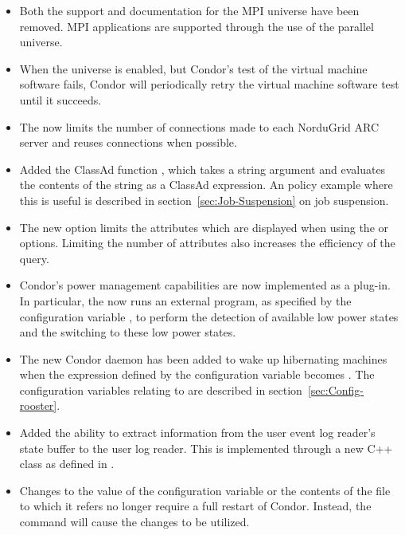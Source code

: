 \begin{itemize}
\item Both the support and documentation for the MPI universe have been removed.
MPI applications are supported through the use of the parallel universe.

\item When the  universe is enabled,
but Condor's test of the virtual machine software fails,
Condor will periodically retry the virtual machine software test until it
succeeds.

\item The  now limits the number of connections
made to each NorduGrid ARC server and reuses connections when possible.

\item Added the ClassAd function , which takes a string
argument and evaluates the contents of the string as a ClassAd
expression.  An policy example where this is useful is described in
section~\ref{sec:Job-Suspension} on job suspension.

\item The new  option  limits the
attributes which are displayed when using the  or 
options.
Limiting the number of attributes also increases the efficiency of the query.

\item Condor's power management capabilities are now implemented as a
  plug-in.  In particular, the  now runs an
  external program, as specified by the configuration variable
  ,
  to perform the detection of available low power states and the
  switching to these low power states.

\item The new Condor daemon  has been added to wake up
hibernating machines when the expression defined by the configuration variable
 becomes .
The configuration variables relating to 
are described in section~\ref{sec:Config-rooster}.

\item Added the ability to extract information from the user event log
  reader's state buffer to the user log reader.  This is implemented
  through a new  C++ class
  as defined in .

\item Changes to the value of the configuration variable
 or the contents
of the file to which it refers no longer require a full restart of Condor.
Instead, the command  will cause the changes to be utilized.


\end{itemize}
